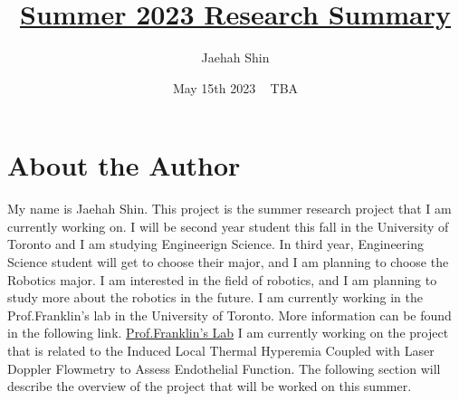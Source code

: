 \documentclass{article}
\title{\underline {\textbf{Summer 2023 Research Summary}}}
\author{Jaehah Shin}
\date{May 15th 2023 ~ TBA}
\begin{document}
\maketitle
\section{About the Author}
\quad
My name is Jaehah Shin.
This project is the summer research project that I am currently working on.
I will be second year student this fall in the University of Toronto and I am studying Engineerign Science.
In third year, Engineering Science student will get to choose their major, and I am planning to choose the Robotics major.
I am interested in the field of robotics, and I am planning to study more about the robotics in the future.
I am currently working in the Prof.Franklin's lab in the University of Toronto. 
More information can be found in the following link. \href{https://franklinresearch.ca}{Prof.Franklin's Lab} 
I am currently working on the project that is related to the Induced Local Thermal Hyperemia Coupled with Laser Doppler Flowmetry to Assess Endothelial Function.
The following section will describe the overview of the project that will be worked on this summer. 
\end{document}
